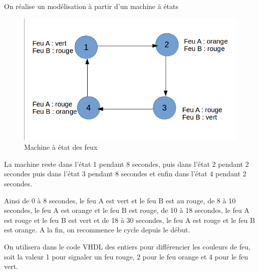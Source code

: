 \documentclass[11pt]{report}
\begin{document}
On réalise un modélisation à partir d'un machine à états

\begin{figure}[h]
\includegraphics[width=12cm]{TP03-2.png}
\caption{Machine à état des feux}
\end{figure}

La machine reste dans l'état 1 pendant 8 secondes, puis dans l'état 2 pendant 2 secondes puis dans l'état 3 pendant 8 secondes et enfin dans l'état 4 pendant 2 secondes.

Ainsi de 0 à 8 secondes, le feu A est vert et le feu B est au rouge, de 8 à 10 secondes, le feu A est orange et le feu B est rouge, de 10 à 18 secondes, le feu A est rouge et le feu B est vert et de 18 à 30 secondes, le feu A est rouge et le feu B est orange. A la fin, on recommence le cycle depuis le début.


On utilisera dans le code VHDL des entiers pour différencier les couleurs de feu, soit la valeur 1 pour signaler un feu rouge, 2 pour le feu orange et 4 pour le feu vert.
\end{document}
